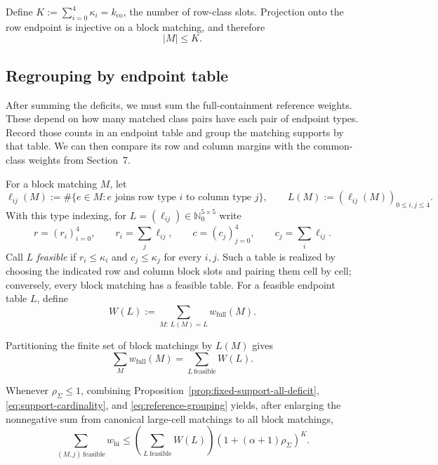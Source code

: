 \documentclass[a4paper,10pt,reqno]{amsart}
\numberwithin{equation}{section}
\theoremstyle{plain}
\theoremstyle{remark}
\begin{document}
Define
$K:=\sum_{i=0}^{4}\kappa_i=k_{\mathrm{co}}$, the number of row-class slots.
Projection onto the row endpoint is injective on a block matching, and therefore
\begin{equation}
  |M|\le K.
  \label{eq:support-cardinality}
\end{equation}

\subsection{Regrouping by endpoint table}

After summing the deficits, we must sum the full-containment reference
weights. These depend on how many matched class pairs have each pair of
endpoint types. Record those counts in an endpoint table and group the
matching supports by that table. We can then compare its row and column
margins with the common-class weights from Section~7.

For a block matching $M$, let
\[
 \ell_{ij}(M):=\#\{e\in M:\text{$e$ joins row type $i$ to column type $j$}\},
 \qquad
 L(M):=(\ell_{ij}(M))_{0\le i,j\le4}.
\]
With this type indexing, for
$L=(\ell_{ij})\in\mathbb N_0^{5\times5}$ write
\[
  r=(r_i)_{i=0}^4,\qquad r_i=\sum_j\ell_{ij},
  \qquad
  c=(c_j)_{j=0}^4,\qquad c_j=\sum_i\ell_{ij}.
\]
Call $L$ \emph{feasible} if $r_i\le\kappa_i$ and $c_j\le\kappa_j$ for every
$i,j$. Such a table is realized by choosing the indicated row and column
block slots and pairing them cell by cell; conversely, every block matching
has a feasible table. For a feasible endpoint table $L$, define
\[
  W(L)
  :=
  \sum_{M:\,L(M)=L}w_{\mathrm{full}}(M).
\]

Partitioning the finite set of block matchings by $L(M)$ gives
\begin{equation}
  \sum_M w_{\mathrm{full}}(M)
  =
  \sum_{L\ \mathrm{feasible}}W(L).
  \label{eq:reference-grouping}
\end{equation}

Whenever $\rho_{\Sigma}\le1$, combining
Proposition~\ref{prop:fixed-support-all-deficit},
\eqref{eq:support-cardinality}, and
\eqref{eq:reference-grouping} yields, after enlarging the nonnegative sum
from canonical large-cell matchings to all block matchings,
\begin{equation}
  \sum_{(M,j)\ \mathrm{feasible}}w_{\mathrm{hi}}
  \le
  \left(\sum_{L\ \mathrm{feasible}}W(L)\right)
  \left(1+(\alpha+1)\rho_{\Sigma}\right)^K.
  \label{eq:coarse-realized-table-reduction}
\end{equation}
\end{document}

